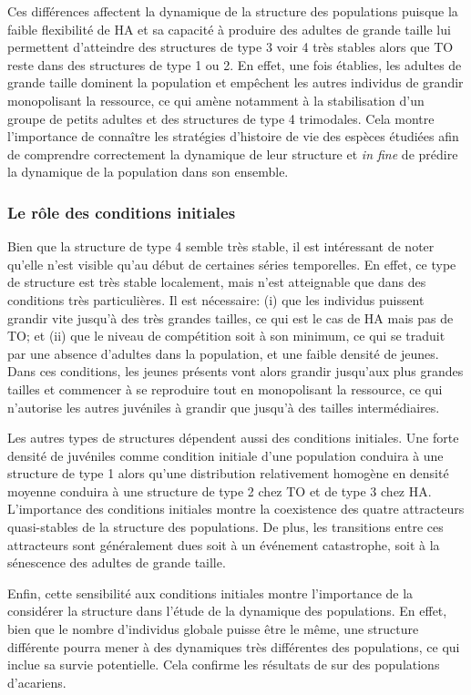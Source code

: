 Ces différences affectent la dynamique de la structure des populations puisque
la faible flexibilité de HA et sa capacité à produire des adultes de grande
taille lui permettent d'atteindre des structures de type 3 voir 4 très
stables alors que TO reste dans des structures de type 1 ou 2. En effet, une
fois établies, les adultes de grande taille dominent la population et empêchent
les autres individus de grandir monopolisant la ressource, ce qui amène
notamment à la stabilisation d'un groupe de petits adultes et des structures de
type 4 trimodales. Cela montre l'importance de connaître les stratégies
d'histoire de vie des espèces étudiées afin de comprendre correctement la
dynamique de leur structure et \textit{in fine} de prédire la dynamique de la
population dans son ensemble.

\subsubsection{Le rôle des conditions initiales}

Bien que la structure de type 4 semble très stable, il est intéressant de noter
qu'elle n'est visible qu'au début de certaines séries temporelles. En effet, ce
type de structure est très stable localement, mais n'est atteignable que dans
des conditions très particulières. Il est nécessaire: (i) que les individus
puissent grandir vite jusqu'à des très grandes tailles, ce qui est le cas
de HA mais pas de TO; et (ii) que le niveau de compétition soit à son minimum,
ce qui se traduit par une absence d'adultes dans la population, et une faible
densité de jeunes. Dans ces conditions, les jeunes présents vont alors grandir
jusqu'aux plus grandes tailles et commencer à se reproduire tout en monopolisant
la ressource, ce qui n'autorise les autres juvéniles à grandir que jusqu'à des
tailles intermédiaires. 

Les autres types de structures dépendent aussi des conditions initiales. Une
forte densité de juvéniles comme condition initiale d'une population conduira à
une structure de type 1 alors qu'une distribution relativement homogène en
densité moyenne conduira à une structure de type 2 chez TO et de type 3 chez HA.
L'importance des conditions initiales montre la coexistence des quatre
attracteurs quasi-stables de la structure des populations. De plus, les
transitions entre ces attracteurs sont généralement dues soit à un événement
catastrophe, soit à la sénescence des adultes de grande taille. 

Enfin, cette sensibilité aux conditions initiales montre l'importance de la
considérer la structure dans l'étude de la dynamique des populations. En effet,
bien que le nombre d'individus globale puisse être le même, une structure
différente pourra mener à des dynamiques très différentes des populations, ce
qui inclue sa survie potentielle. Cela confirme les résultats de
\textcites{benton2005a} sur des populations d'acariens. 

